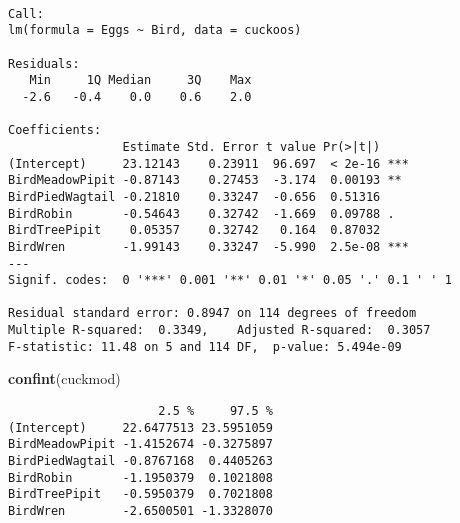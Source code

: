 \documentclass[]{article}
\newenvironment{Shaded}{\begin{snugshade}}{\end{snugshade}}
\newcommand{\KeywordTok}[1]{\textcolor[rgb]{0.13,0.29,0.53}{\textbf{#1}}}
\newcommand{\DataTypeTok}[1]{\textcolor[rgb]{0.13,0.29,0.53}{#1}}
\newcommand{\StringTok}[1]{\textcolor[rgb]{0.31,0.60,0.02}{#1}}
\newcommand{\CommentTok}[1]{\textcolor[rgb]{0.56,0.35,0.01}{\textit{#1}}}
\newcommand{\OperatorTok}[1]{\textcolor[rgb]{0.81,0.36,0.00}{\textbf{#1}}}
\newcommand{\NormalTok}[1]{#1}
\begin{document}
\begin{verbatim}

Call:
lm(formula = Eggs ~ Bird, data = cuckoos)

Residuals:
   Min     1Q Median     3Q    Max 
  -2.6   -0.4    0.0    0.6    2.0 

Coefficients:
                Estimate Std. Error t value Pr(>|t|)    
(Intercept)     23.12143    0.23911  96.697  < 2e-16 ***
BirdMeadowPipit -0.87143    0.27453  -3.174  0.00193 ** 
BirdPiedWagtail -0.21810    0.33247  -0.656  0.51316    
BirdRobin       -0.54643    0.32742  -1.669  0.09788 .  
BirdTreePipit    0.05357    0.32742   0.164  0.87032    
BirdWren        -1.99143    0.33247  -5.990  2.5e-08 ***
---
Signif. codes:  0 '***' 0.001 '**' 0.01 '*' 0.05 '.' 0.1 ' ' 1

Residual standard error: 0.8947 on 114 degrees of freedom
Multiple R-squared:  0.3349,    Adjusted R-squared:  0.3057 
F-statistic: 11.48 on 5 and 114 DF,  p-value: 5.494e-09
\end{verbatim}

\begin{Shaded}
\begin{Highlighting}[]
\KeywordTok{confint}\NormalTok{(cuckmod)}
\end{Highlighting}
\end{Shaded}

\begin{verbatim}
                     2.5 %     97.5 %
(Intercept)     22.6477513 23.5951059
BirdMeadowPipit -1.4152674 -0.3275897
BirdPiedWagtail -0.8767168  0.4405263
BirdRobin       -1.1950379  0.1021808
BirdTreePipit   -0.5950379  0.7021808
BirdWren        -2.6500501 -1.3328070
\end{verbatim}

\begin{Shaded}
\end{Shaded}
\end{document}
